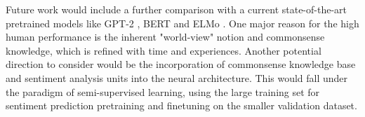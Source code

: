 \documentclass{article}
\begin{document}
Future work would include a further comparison with a current state-of-the-art pretrained models like GPT-2 \citep{radford2019language}, BERT \citep{Bert} and ELMo \citep{Elmo}. One major reason for the high human performance is the inherent "world-view" notion and commonsense knowledge, which is refined with time and experiences. Another potential direction to consider would be the incorporation of commonsense knowledge base and sentiment analysis units \citep{CommonSense} into the neural architecture. This would fall under the paradigm of semi-supervised learning, using the large training set for sentiment prediction pretraining and finetuning on the smaller validation dataset.


\end{document}
